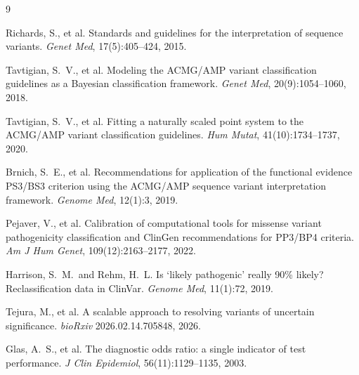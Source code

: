 \documentclass[11pt]{article}
\begin{document}

\begin{thebibliography}{9}

Richards, S., et al.
\newblock Standards and guidelines for the interpretation of sequence variants.
\newblock \textit{Genet Med}, 17(5):405--424, 2015.

Tavtigian, S.~V., et al.
\newblock Modeling the ACMG/AMP variant classification guidelines as a
  Bayesian classification framework.
\newblock \textit{Genet Med}, 20(9):1054--1060, 2018.

Tavtigian, S.~V., et al.
\newblock Fitting a naturally scaled point system to the ACMG/AMP variant
  classification guidelines.
\newblock \textit{Hum Mutat}, 41(10):1734--1737, 2020.

Brnich, S.~E., et al.
\newblock Recommendations for application of the functional evidence PS3/BS3
  criterion using the ACMG/AMP sequence variant interpretation framework.
\newblock \textit{Genome Med}, 12(1):3, 2019.

Pejaver, V., et al.
\newblock Calibration of computational tools for missense variant pathogenicity
  classification and ClinGen recommendations for PP3/BP4 criteria.
\newblock \textit{Am J Hum Genet}, 109(12):2163--2177, 2022.

Harrison, S.~M.\ and Rehm, H.~L.
\newblock Is `likely pathogenic' really 90\% likely? Reclassification data in
  ClinVar.
\newblock \textit{Genome Med}, 11(1):72, 2019.

Tejura, M., et al.
\newblock A scalable approach to resolving variants of uncertain significance.
\newblock \textit{bioRxiv} 2026.02.14.705848, 2026.

Glas, A.~S., et al.
\newblock The diagnostic odds ratio: a single indicator of test performance.
\newblock \textit{J Clin Epidemiol}, 56(11):1129--1135, 2003.

\end{thebibliography}
\end{document}
